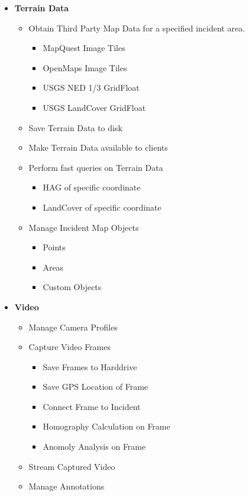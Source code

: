 \documentclass[12pt]{IEEEtran}
\begin{document}
\begin{figure}[htp]
\begin{itemize}
		\item \textbf{Terrain Data}
		\begin{itemize}
			\item Obtain Third Party Map Data for a specified incident area.
	  		\begin{itemize}
	  		  	\item MapQuest Image Tiles
	  		  	\item OpenMaps Image Tiles
	  		  	\item USGS NED 1/3 GridFloat
	  		  	\item USGS LandCover GridFloat
		  	\end{itemize}
		  	\item Save Terrain Data to disk
		  	\item Make Terrain Data available to clients
		  	\item Perform fast queries on Terrain Data
	  		\begin{itemize}
	  		  	\item HAG of specific coordinate
	  		  	\item LandCover of specific coordinate
		  	\end{itemize}
	  		\item Manage Incident Map Objects
			\begin{itemize}
			  \item Points
			  \item Areas
			  \item Custom Objects
			\end{itemize}
		\end{itemize}
		
		\item \textbf{Video}
		\begin{itemize}
	  		\item Manage Camera Profiles
	  		\item Capture Video Frames
	  		\begin{itemize}
	  	 		\item Save Frames to Harddrive
	  	  		\item Save GPS Location of Frame
	  	  		\item Connect Frame to Incident
	  	  		\item Homography Calculation on Frame
	  	  		\item Anomoly Analysis on Frame
	  		\end{itemize}
		  	\item Stream Captured Video
		  	\item Manage Annotations
		\end{itemize}
		

\end{itemize}
\end{figure}
\end{document}
